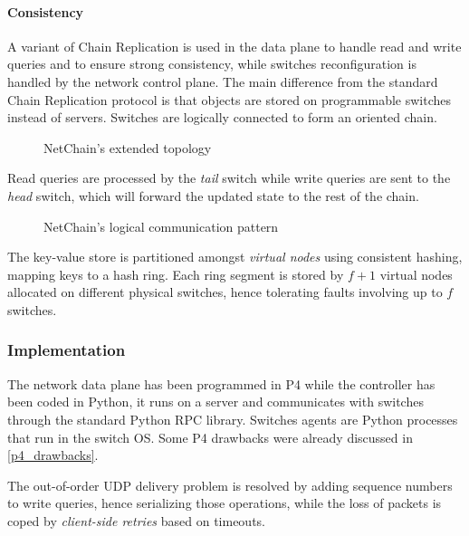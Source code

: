 \paragraph{Consistency}
A variant of Chain Replication \cite{chainreplication} is used in the data plane to handle read and write queries and to ensure strong consistency, while switches reconfiguration is handled by the network control plane.
The main difference from the standard Chain Replication \cite{chainreplication} protocol is that objects are stored on programmable switches instead of servers.
Switches are logically connected to form an oriented chain.

\begin{figure}[!htb]
    \centering
    \usebox{\netchainextended}
    \caption{NetChain's \texorpdfstring{\cite{netchain}}{} extended topology}
\end{figure}

Read queries are processed by the \textit{tail} switch while write queries are sent to the \textit{head} switch, which will forward the updated state to the rest of the chain.

\begin{figure}[!htb]
    \centering
    \usebox{\netchaincommunication}
    \caption{NetChain's \texorpdfstring{\cite{netchain}}{} logical communication pattern}
\end{figure}

The key-value store is partitioned amongst \textit{virtual nodes} using consistent hashing, mapping keys to a hash ring.
Each ring segment is stored by $f + 1$ virtual nodes allocated on different physical switches, hence tolerating faults involving up to $f$ switches.

\subsubsection{Implementation}
The network data plane has been programmed in P4 \cite{p4} while the controller has been coded in Python, it runs on a server and communicates with switches through the standard Python RPC library.
Switches agents are Python processes that run in the switch OS. Some P4 \cite{p4} drawbacks were already discussed in \cref{p4_drawbacks}.\par
The out-of-order UDP delivery problem is resolved by adding sequence numbers to write queries, hence serializing those operations, while the loss of packets is coped by \textit{client-side retries} based on timeouts.

